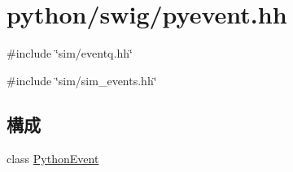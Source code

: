\hypertarget{pyevent_8hh}{
\section{python/swig/pyevent.hh}
\label{pyevent_8hh}
}
{\ttfamily \#include \char`\"{}sim/eventq.hh\char`\"{}}\par
{\ttfamily \#include \char`\"{}sim/sim\_\-events.hh\char`\"{}}\par
\subsection*{構成}
\begin{DoxyCompactItemize}
\item 
class \hyperlink{classPythonEvent}{PythonEvent}
\end{DoxyCompactItemize}
